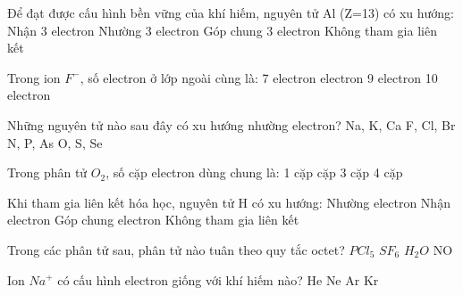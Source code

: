 \begin{ex}
	Để đạt được cấu hình bền vững của khí hiếm, nguyên tử Al (Z=13) có xu hướng:
	\choice
	{Nhận 3 electron}
	{\True Nhường 3 electron}
	{Góp chung 3 electron}
	{Không tham gia liên kết}
\end{ex}
\begin{ex}
	Trong ion $F^-$, số electron ở lớp ngoài cùng là:
	\choice
	{7 electron}
	{ electron}
	{9 electron}
	{10 electron}
\end{ex}
\begin{ex}
	Những nguyên tử nào sau đây có xu hướng nhường electron?
	\choice
	{\True Na, K, Ca}
	{F, Cl, Br}
	{N, P, As}
	{O, S, Se}
\end{ex}
\begin{ex}
	Trong phân tử $O_2$, số cặp electron dùng chung là:
	\choice
	{1 cặp}
	{ cặp}
	{3 cặp}
	{4 cặp}
\end{ex}
\begin{ex}
	Khi tham gia liên kết hóa học, nguyên tử H có xu hướng:
	\choice
	{Nhường electron}
	{Nhận electron}
	{\True Góp chung electron}
	{Không tham gia liên kết}
\end{ex}
\begin{ex}
	Trong các phân tử sau, phân tử nào tuân theo quy tắc octet?
	\choice
	{$PCl_5$}
	{$SF_6$}
	{\True $H_2O$}
	{NO}
\end{ex}
\begin{ex}
	Ion $Na^+$ có cấu hình electron giống với khí hiếm nào?
	\choice
	{He}
	{\True Ne}
	{Ar}
	{Kr}
\end{ex}
